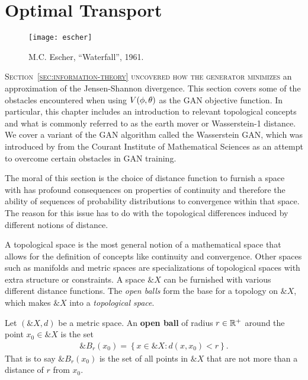 \section{Optimal Transport}
\label{sec:optimal-transport}

\vspace{1cm}

\begin{figure}[h]
  \label{fig:paradise} \centering
   {
    \texttt{[image: escher]}
  }
  \caption{M.C. Escher, ``Waterfall'', 1961.}
\end{figure}

\vspace{1cm}

\lettrine[lines=3]{\Royal S}{ection~\ref{sec:information-theory}
  uncovered how the generator minimizes} an approximation of the
Jensen-Shannon divergence. This section covers some of the obstacles
encountered when using $V(\phi, \theta)$ as the GAN objective function. In
particular, this chapter includes an introduction to relevant
topological concepts and what is commonly referred to as the earth
mover or Wasserstein-1 distance.  We cover a variant of the GAN
algorithm called the Wasserstein GAN, which was introduced by
\cite{ref:arjovsky-2017} from the Courant Institute of Mathematical
Sciences as an attempt to overcome certain obstacles in GAN training.

The moral of this section is the choice of distance function to
furnish a space with has profound consequences on properties of
continuity and therefore the ability of sequences of probability
distributions to convergence within that space.  The reason for this
issue has to do with the topological differences induced by different
notions of distance.

A topological space is the most general notion of a mathematical space
that allows for the definition of concepts like continuity and
convergence.  Other spaces such as manifolds and metric spaces are
specializations of topological spaces with extra structure or
constraints.  A space $\&X$ can be furnished with various different
distance functions.  The \textit{open balls} form the base for a
topology on $\&X$, which makes $\&X$ into a \textit{topological
  space}.

\begin{definition}
  Let $(\&X, d)$ be a metric space. An \textbf{open ball} of radius
  $r \in \mathbb{R}^+$ around the point $x_0 \in \&X$ is the set
  \begin{align}
    \&B_r(x_0) = \left\{ x \in \&X : d(x,x_0) < r \right\}.
  \end{align}
  That is to say $\&B_r(x_0)$ is the set of all points in $\&X$ that
  are not more than a distance of $r$ from $x_0$.
\end{definition}

